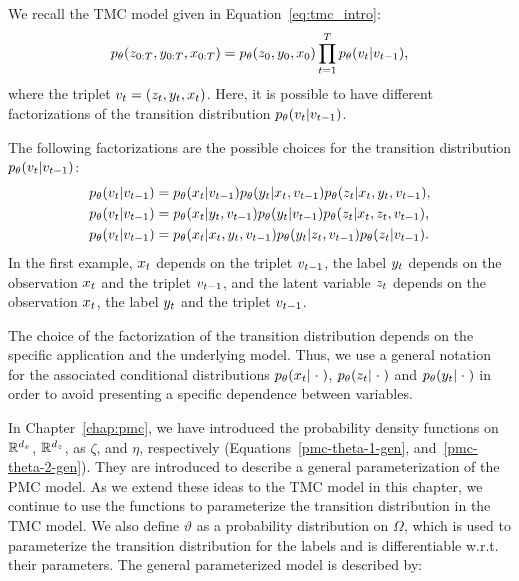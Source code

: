 


We recall the TMC model given in Equation~\eqref{eq:tmc_intro}:
$$p_{\theta}( z_{0:T}, y_{0:T}, x_{0:T} ) = p_{\theta}(z_0,y_0,  x_0) 
\prod_{t=1}^T p_{\theta}({v}_t| {v}_{t-1}) \text{,}$$
where the triplet ${v}_t=(z_t, y_t,  x_t)$.
Here, it is possible to have different factorizations of the transition
distribution $p_{\theta}({v}_t| {v}_{t-1})$. 

\begin{example}
    The following factorizations are  the possible choices for the transition
    distribution $p_{\theta}({v}_t| {v}_{t-1})$:
    \begin{align*}
        p_{\theta}({v}_t| {v}_{t-1}) 
         &= p_{\theta}(x_{t}| {v}_{t-1}) p_{\theta}(y_{t}| x_{t}, {v}_{t-1}) p_{\theta}(z_{t}| x_{t}, y_{t}, {v}_{t-1}) 
         \text{,}\\
        p_{\theta}({v}_t| {v}_{t-1}) &= p_{\theta}(x_{t}| y_{t}, {v}_{t-1}) p_{\theta}(y_{t}| {v}_{t-1}) 
        p_{\theta}(z_{t}|x_{t},  z_{t}, {v}_{t-1}) \text{,}\\
        p_{\theta}({v}_t| {v}_{t-1}) &= p_{\theta}(x_{t}| x_{t}, y_{t}, {v}_{t-1}) p_{\theta}(y_{t}| z_{t}, {v}_{t-1})
        p_{\theta}(z_{t}|{v}_{t-1}) \text{.}
    \end{align*}
    In the first example, $x_t$ depends on the triplet
    ${v}_{t-1}$,  the label $y_t$ depends on the observation $x_t$
    and the triplet ${v}_{t-1}$, and the latent variable $z_t$ depends on
    the observation $x_t$, the label $y_t$ and the triplet ${v}_{t-1}$.
\end{example}
The choice of the factorization of the transition distribution depends on 
the specific application and the underlying model.
Thus,  we use a general notation for the associated
 conditional distributions
$p_{\theta}(x_t |\;\cdot\;)$, $p_{\theta}(z_t| \;\cdot\;)$ and $p_{\theta}(y_t | \;\cdot\;)$ 
in order to avoid presenting a specific dependence between variables. 


In Chapter~\ref{chap:pmc}, 
we have introduced the probability density functions on $\mathbb{R}^{d_x}$, 
$\mathbb{R}^{d_z}$, as $\zeta$, 
and $\eta$, respectively 
(Equations~\eqref{pmc-theta-1-gen}, and~\eqref{pmc-theta-2-gen}).
They are introduced to describe a general parameterization of the PMC model.
As we extend these ideas to the TMC model in this chapter, 
we continue to use the functions to parameterize the transition distribution 
in the TMC model.
We also define $\vartheta$ as a probability distribution on $\Omega$, 
which is used to parameterize the transition distribution for the labels
and is differentiable w.r.t. their parameters.
The general parameterized model is described by:

